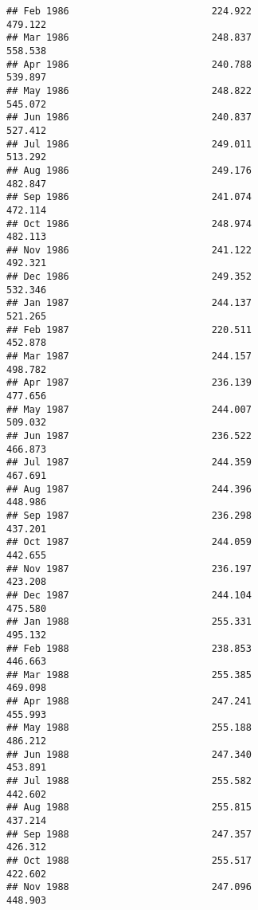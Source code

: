 \documentclass[
]{article}
\begin{document}
\begin{verbatim}
## Feb 1986                         224.922                           479.122
## Mar 1986                         248.837                           558.538
## Apr 1986                         240.788                           539.897
## May 1986                         248.822                           545.072
## Jun 1986                         240.837                           527.412
## Jul 1986                         249.011                           513.292
## Aug 1986                         249.176                           482.847
## Sep 1986                         241.074                           472.114
## Oct 1986                         248.974                           482.113
## Nov 1986                         241.122                           492.321
## Dec 1986                         249.352                           532.346
## Jan 1987                         244.137                           521.265
## Feb 1987                         220.511                           452.878
## Mar 1987                         244.157                           498.782
## Apr 1987                         236.139                           477.656
## May 1987                         244.007                           509.032
## Jun 1987                         236.522                           466.873
## Jul 1987                         244.359                           467.691
## Aug 1987                         244.396                           448.986
## Sep 1987                         236.298                           437.201
## Oct 1987                         244.059                           442.655
## Nov 1987                         236.197                           423.208
## Dec 1987                         244.104                           475.580
## Jan 1988                         255.331                           495.132
## Feb 1988                         238.853                           446.663
## Mar 1988                         255.385                           469.098
## Apr 1988                         247.241                           455.993
## May 1988                         255.188                           486.212
## Jun 1988                         247.340                           453.891
## Jul 1988                         255.582                           442.602
## Aug 1988                         255.815                           437.214
## Sep 1988                         247.357                           426.312
## Oct 1988                         255.517                           422.602
## Nov 1988                         247.096                           448.903

\end{verbatim}
\end{document}
